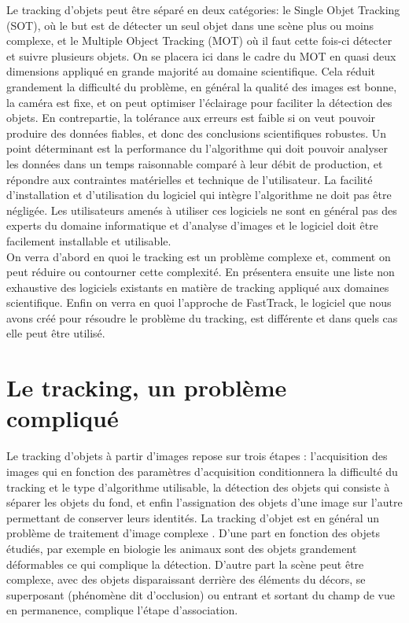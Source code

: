   Le tracking d'objets peut être séparé en deux catégories: le Single Objet Tracking (SOT), où le but est de détecter un seul objet dans une scène plus ou moins complexe, et le Multiple Object Tracking (MOT) \cite{luo2014multiple} où il faut cette fois-ci détecter et suivre plusieurs objets. On se placera ici dans le cadre du MOT en quasi deux dimensions appliqué en grande majorité au domaine scientifique. Cela réduit grandement la difficulté du problème, en général la qualité des images est bonne, la caméra est fixe, et on peut optimiser l'éclairage pour faciliter la détection des objets. En contrepartie, la tolérance aux erreurs est faible si on veut pouvoir produire des données fiables, et donc des conclusions scientifiques robustes. Un point déterminant est la performance du l’algorithme qui doit pouvoir analyser les données dans un temps raisonnable comparé à leur débit de production, et répondre aux contraintes matérielles et technique de l'utilisateur. La facilité d'installation et d'utilisation du logiciel qui intègre l’algorithme ne doit pas être négligée. Les utilisateurs amenés à utiliser ces logiciels ne sont en général pas des experts du domaine informatique et d'analyse d'images et le logiciel doit être facilement installable et utilisable.\\

  On verra d'abord en quoi le tracking est un problème complexe et, comment on peut réduire ou contourner cette complexité. En présentera ensuite une liste non exhaustive des logiciels existants en matière de tracking appliqué aux domaines scientifique. Enfin on verra en quoi l'approche de FastTrack, le logiciel que nous avons créé pour résoudre le problème du tracking, est différente et dans quels cas elle peut être utilisé.


	\section{Le tracking, un problème compliqué}
  Le tracking d'objets à partir d'images repose sur trois étapes : l'acquisition des images qui en fonction des paramètres d'acquisition conditionnera la difficulté du tracking et le type d'algorithme utilisable, la détection des objets qui consiste à séparer les objets du fond, et enfin l'assignation des objets d'une image sur l'autre permettant de conserver leurs identités. La tracking d'objet est en général un problème de traitement d'image complexe \cite{dell2014automated}. D'une part en fonction des objets étudiés, par exemple en biologie les animaux sont des objets grandement déformables ce qui complique la détection. D'autre part la scène peut être complexe, avec des objets disparaissant derrière des éléments du décors, se superposant (phénomène dit d'occlusion) ou entrant et sortant du champ de vue en permanence, complique l'étape d'association.\\
  
